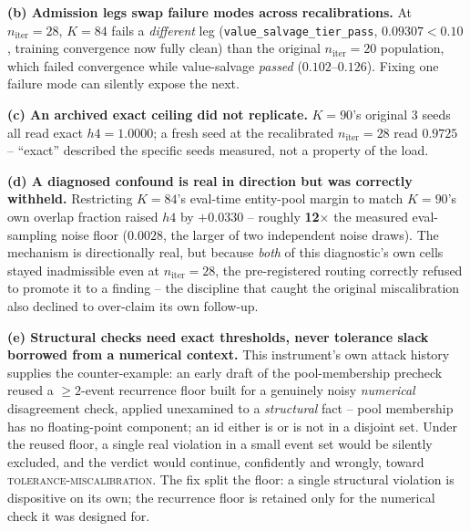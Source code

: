 \documentclass[10pt,letterpaper]{article}
\newcommand{\niter}{n_{\mathrm{iter}}}
\begin{document}
\textbf{(b) Admission legs swap failure modes across recalibrations.}
At $\niter=28$, $K{=}84$ fails a \emph{different} leg
(\texttt{value\_salvage\_tier\_pass}, $0.09307 < 0.10$, training
convergence now fully clean) than the original $\niter=20$ population,
which failed convergence while value-salvage \emph{passed}
($0.102$--$0.126$). Fixing one failure mode can silently expose the next.

\textbf{(c) An archived exact ceiling did not replicate.} $K{=}90$'s
original 3 seeds all read exact $h4=1.0000$; a fresh seed at the
recalibrated $\niter=28$ read $0.9725$ -- ``exact'' described the specific
seeds measured, not a property of the load.

\textbf{(d) A diagnosed confound is real in direction but was correctly
withheld.} Restricting $K{=}84$'s eval-time entity-pool margin to match
$K{=}90$'s own overlap fraction raised $h4$ by $+0.0330$ -- roughly
\textbf{12$\times$} the measured eval-sampling noise floor ($0.0028$, the
larger of two independent noise draws). The mechanism is directionally
real, but because \emph{both} of this diagnostic's own cells stayed
inadmissible even at $\niter=28$, the pre-registered routing correctly
refused to promote it to a finding -- the discipline that caught the
original miscalibration also declined to over-claim its own follow-up.

\textbf{(e) Structural checks need exact thresholds, never tolerance
slack borrowed from a numerical context.} This instrument's own attack
history supplies the counter-example: an early draft of the
pool-membership precheck reused a $\ge2$-event recurrence floor built for
a genuinely noisy \emph{numerical} disagreement check, applied unexamined
to a \emph{structural} fact -- pool membership has no floating-point
component; an id either is or is not in a disjoint set. Under the reused
floor, a single real violation in a small event set would be silently
excluded, and the verdict would continue, confidently and wrongly, toward
\textsc{tolerance-miscalibration}. The fix split the floor: a single
structural violation is dispositive on its own; the recurrence floor is
retained only for the numerical check it was designed for.
\end{document}
